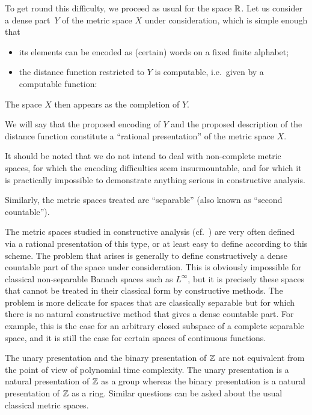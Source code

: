 To get round this difficulty, we proceed as  usual for the space $\mathbb {R}$. 
Let us consider a dense part~$Y$ of the metric space $X$ under consideration, which is simple enough that 
\begin{itemize}

\item 
its elements can be encoded as (certain) words on a fixed finite alphabet;

\item 
the distance function restricted to $Y$ is computable, i.e.\ given by a computable function:

\end{itemize}

The space $X$ then appears as the completion of $Y$.

We will say that the proposed encoding of $Y$ and the proposed description of the distance function constitute a ``rational presentation'' of the metric space $X$.
 
It should be noted that we do not intend to deal with non-complete metric spaces, for which the encoding difficulties seem insurmountable, and for which it is practically impossible to demonstrate anything serious in constructive analysis.

Similarly, the metric spaces treated are ``separable'' (also known as ``second countable'').

\smallskip The metric spaces studied in constructive analysis (cf.\ \cite{BB}) are very often defined via a rational presentation of this type, or at least easy to define according to this scheme. 
The problem that arises is generally to define constructively a dense countable part of the space under consideration. This is obviously impossible for classical non-separable Banach spaces such as $L^\infty$, but it is precisely these spaces that cannot be treated in their classical form by constructive methods. 
The problem is more delicate for spaces that are classically separable but for which there is no natural constructive method that gives a dense countable part. 
For example, this is the case for an arbitrary closed subspace of a complete separable space, and it is still the case for certain spaces of continuous functions.

\smallskip The unary presentation and the binary presentation of $\mathbb {Z}$ are not equivalent from the point of view of polynomial time complexity. 
The unary presentation is a natural presentation of $\mathbb {Z}$ as a group whereas the binary presentation is a natural presentation of $\mathbb {Z}$ as a ring. Similar questions can be asked about the usual classical metric spaces.

